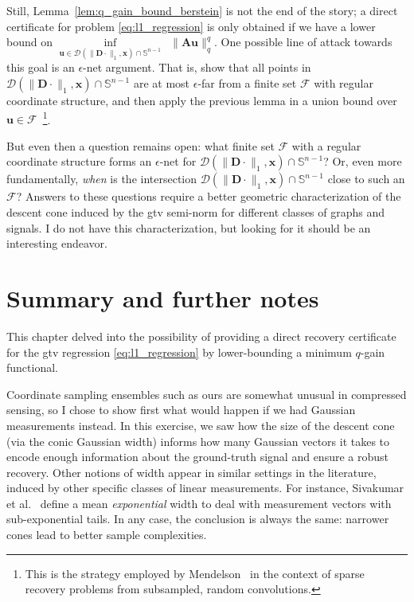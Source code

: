 Still, Lemma~\ref{lem:q_gain_bound_berstein} is not the end of the story; a direct certificate for problem \eqref{eq:l1_regression} is only obtained if we have a lower bound on $\underset{\mathbf{u} \in \mathcal{D}( \|\mathbf{D} \cdot \|_1, \mathbf{x}) \cap \mathbb{S}^{n-1}}{\inf} \enspace \|\mathbf{Au}\|_q^q$. One possible line of attack towards this goal is an $\epsilon$-net argument. That is, show that all points in $\mathcal{D}( \|\mathbf{D} \cdot \|_1, \mathbf{x}) \cap \mathbb{S}^{n-1}$ are at most $\epsilon$-far from a finite set $\mathcal{F}$ with regular coordinate structure, and then apply the previous lemma in a union bound over $\mathbf{u} \in \mathcal{F}$~\footnote{This is the strategy employed by Mendelson~\cite{mendelson2018a} in the context of sparse recovery problems from subsampled, random convolutions.}.

But even then a question remains open: what finite set $\mathcal{F}$ with a regular coordinate structure forms an $\epsilon$-net for $\mathcal{D}( \|\mathbf{D} \cdot \|_1, \mathbf{x}) \cap \mathbb{S}^{n-1}$? Or, even more fundamentally, \emph{when} is the intersection $\mathcal{D}( \|\mathbf{D} \cdot \|_1, \mathbf{x}) \cap \mathbb{S}^{n-1}$ close to such an $\mathcal{F}$? Answers to these questions require a better geometric characterization of the descent cone induced by the \acrshort{gtv} semi-norm for different classes of graphs and signals. I do not have this characterization, but looking for it should be an interesting endeavor.


\section{Summary and further notes}

This chapter delved into the possibility of providing a direct recovery certificate for the \acrlong{gtv} regression \eqref{eq:l1_regression} by lower-bounding a minimum $q$-gain functional.

Coordinate sampling ensembles such as ours are somewhat unusual in compressed sensing, so I chose to show first what would happen if we had Gaussian measurements instead. In this exercise, we saw how the size of the descent cone (via the conic Gaussian width) informs how many Gaussian vectors it takes to encode enough information about the ground-truth signal and ensure a robust recovery. Other notions of width appear in similar settings in the literature, induced by other specific classes of linear measurements. For instance, Sivakumar et al.~\cite{sivakumar2015a} define a mean \emph{exponential} width to deal with measurement vectors with sub-exponential tails. In any case, the conclusion is always the same: narrower cones lead to better sample complexities.

